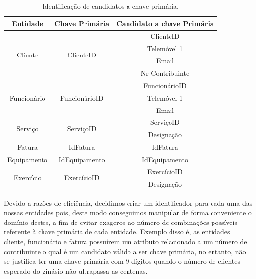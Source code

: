 \begin{table}[h]
\centering
\begin{tabular}{|c|c|c|}
\hline
Entidade                     & Chave Primária                 & Candidato a chave Primária \\ \hline
\multirow{4}{*}{Cliente}     & \multirow{4}{*}{ClienteID}     & ClienteID                  \\
                             &                                & Telemóvel 1                \\
                             &                                & Email                      \\
                             &                                & Nr Contribuinte            \\ \hline
\multirow{3}{*}{Funcionário} & \multirow{3}{*}{FuncionárioID} & FuncionárioID              \\
                             &                                & Telemóvel 1                   \\
                             &                                & Email                      \\ \hline
\multirow{2}{*}{Serviço}     & \multirow{2}{*}{ServiçoID}     & ServiçoID                  \\
                             &                                & Designação                 \\ \hline
Fatura                       & IdFatura                       & IdFatura                \\ \hline
Equipamento                  & IdEquipamento                  & IdEquipamento              \\ \hline
\multirow{2}{*}{Exercício}   & \multirow{2}{*}{ExercícioID}   & ExercícioID                \\
                             &                                & Designação                 \\ \hline
\end{tabular}
\caption{Identificação de candidatos a chave primária.}
\end{table}

Devido a razões de eficiência, decidimos criar um identificador para cada uma das nossas entidades pois, deste modo conseguimos manipular de forma conveniente o domínio destes, a fim de evitar exageros no número de combinações possíveis referente à chave primária de cada entidade. Exemplo disso é, as entidades cliente, funcionário e fatura possuírem um atributo relacionado a um número de contribuinte o qual é um candidato válido a ser chave primária, no entanto, não se justifica ter uma chave primária com 9 dígitos quando o número de clientes esperado do ginásio não ultrapassa as centenas.


